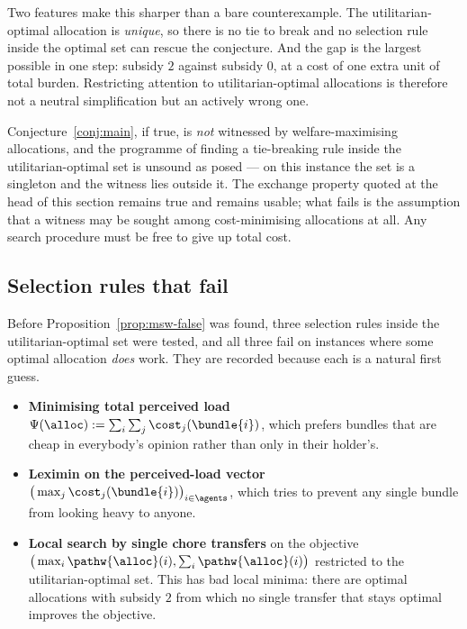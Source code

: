Two features make this sharper than a bare counterexample. The
utilitarian-optimal allocation is \emph{unique}, so there is no tie to break and
no selection rule inside the optimal set can rescue the conjecture. And the gap
is the largest possible in one step: subsidy $2$ against subsidy $0$, at a cost
of one extra unit of total burden. Restricting attention to utilitarian-optimal
allocations is therefore not a neutral simplification but an actively wrong one.

\begin{remark}
\label{rem:msw-deadend}
Conjecture~\ref{conj:main}, if true, is \emph{not} witnessed by
welfare-maximising allocations, and the programme of finding a tie-breaking rule
inside the utilitarian-optimal set is unsound as posed --- on this instance the
set is a singleton and the witness lies outside it. The exchange property quoted
at the head of this section remains true and remains usable; what fails is the
assumption that a witness may be sought among cost-minimising allocations at
all. Any search procedure must be free to give up total cost.
\end{remark}

\subsection{Selection rules that fail}
\label{sec:tiebreaks}

Before Proposition~\ref{prop:msw-false} was found, three selection rules inside
the utilitarian-optimal set were tested, and all three fail on instances where
some optimal allocation \emph{does} work. They are recorded because each is a
natural first guess.

\begin{itemize}
  \item \textbf{Minimising total perceived load} $\Psi(\alloc) := \sum_{i}
    \sum_{j} \cost_j(\bundle{i})$, which prefers bundles that are cheap in
    everybody's opinion rather than only in their holder's.
  \item \textbf{Leximin on the perceived-load vector} $\big(\max_j
    \cost_j(\bundle{i})\big)_{i \in \agents}$, which tries to prevent any single
    bundle from looking heavy to anyone.
  \item \textbf{Local search by single chore transfers} on the objective
    $\big(\max_i \pathw{\alloc}(i), \sum_i \pathw{\alloc}(i)\big)$ restricted to
    the utilitarian-optimal set. This has bad local minima: there are optimal
    allocations with subsidy $2$ from which no single transfer that stays
    optimal improves the objective.
\end{itemize}

